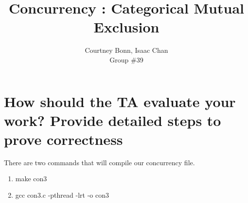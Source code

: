 \documentclass[letterpaper,10pt,draftclsnofoot,onecolumn,titlepage]{IEEEtran}
\def\name{Courtney Bonn, Isaac Chan}
\def\grp{Group \#39}
\begin{document}
\title{Concurrency : Categorical Mutual Exclusion}
\author{\name \\ \grp}

\maketitle


\section{ How should the TA evaluate your work? Provide detailed steps to prove correctness} 

There are two commands that will compile our concurrency file. 

\begin{enumerate}
	\item make con3
	\item gcc con3.c -pthread -lrt -o con3
\end{enumerate}
\end{document}
